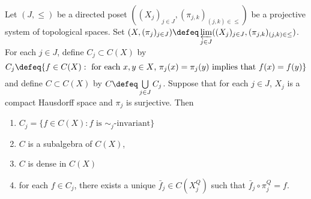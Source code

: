 \documentclass{book}
\begin{document}
\begin{note}
\end{note}	

\begin{ex}
	Let $(J, {\leq})$ be a directed poset $((X_j)_{j \in J}, (\pi_{j,k})_{(j,k) \in \leq})$ be a projective system of topological spaces. Set $(X, (\pi_j)_{j \in J}) \defeq \varprojlim\limits_{j \in J} ((X_j)_{j \in J}, (\pi_{j,k})_{(j,k) \in \leq})$. For each $j \in J$, define $C_j \subset C(X)$ by 
	$$C_j \defeq \{f \in C(X): \text{ for each $x,y \in X$, $\pi_j(x) = \pi_j(y)$ implies that $f(x) = f(y)$}\}$$
	and define $C \subset C(X)$ by $C \defeq \bigcup\limits_{j \in J} C_j$. Suppose that for each $j \in J$, $X_j$ is a compact Hausdorff space and $\pi_j$ is surjective. Then 
	\begin{enumerate}
		\item $C_j = \{f \in C(X): \text{$f$ is $\sim_j$-invariant}\}$
		\item $C$ is a subalgebra of $C(X)$,
		\item $C$ is dense in $C(X)$ 
		\item for each $f \in C_j$, there exists a unique $\bar{f}_j \in C(X^Q_j)$ such that $\bar{f}_j \circ \pi^Q_j = f$. 
	\end{enumerate}
\end{ex}
\end{document}
